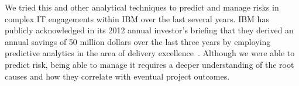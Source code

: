  We tried this and other analytical techniques to predict and manage risks in complex IT engagements within IBM over the last several years. IBM has publicly acknowledged in its 2012 annual investor's briefing that they derived an annual savings of 50 million dollars over the last three years by employing predictive analytics in the area of delivery excellence~\cite{ibm-investors-briefing}. Although we were able to predict risk, being able to manage it requires a deeper understanding of the root causes and how they correlate with eventual project outcomes. 

\label{sec:risk}
